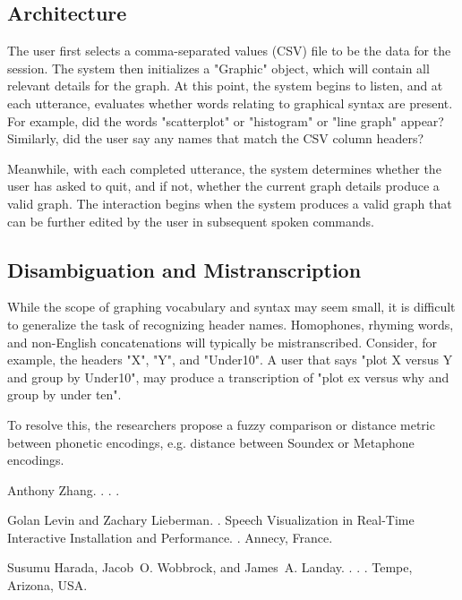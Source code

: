 \documentclass[11pt]{article}
\begin{document}
\subsection{Architecture}
The user first selects a comma-separated values (CSV) file to be the data for the session. 
The system then initializes a "Graphic" object, which will contain all relevant details for the 
graph. At this point, the system begins to listen, and at each utterance, evaluates whether 
words relating to graphical syntax are present. For example, did the words "scatterplot" or 
"histogram" or "line graph" appear? Similarly, did the user say any names that match the CSV 
column headers?

Meanwhile, with each completed utterance, the system determines whether the user has asked to quit, and if not, whether the current graph details produce a valid graph. The interaction begins when the system produces a valid graph that can be further edited by the user in subsequent spoken commands.

\subsection{Disambiguation and Mistranscription}
While the scope of graphing vocabulary and syntax may seem small, it is difficult to 
generalize the task of recognizing header names. Homophones, rhyming words, and non-English
concatenations will typically be mistranscribed. Consider, for example, the headers "X", "Y", and "Under10". A user that says "plot X versus Y and group by Under10", may produce a transcription of "plot ex versus why and group by under ten".

To resolve this, the researchers propose a fuzzy comparison or distance metric between phonetic encodings, e.g. distance between Soundex or Metaphone encodings.

%
%

\begin{thebibliography}{}

{Anthony Zhang}.
.
.
.

Golan Levin and Zachary Lieberman.
.
 Speech Visualization in Real-Time Interactive Installation and Performance.
.
\newblock Annecy, France.

{Susumu Harada, Jacob~O. Wobbrock, and James~A. Landay}.
.
.
.
\newblock Tempe, Arizona, USA.

\end{thebibliography}
\end{document}
